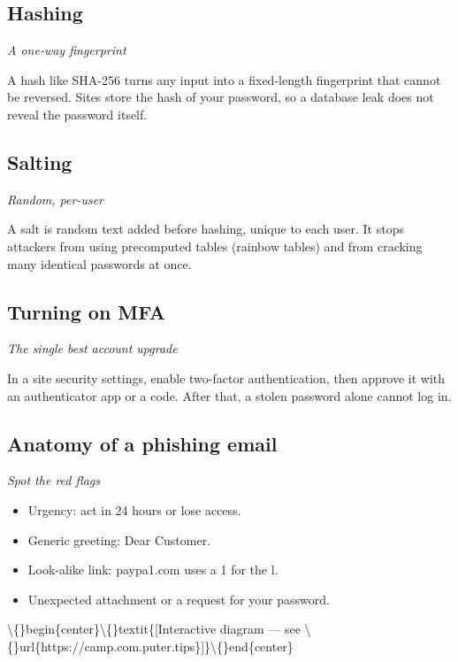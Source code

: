 \documentclass[12pt,openany]{book}
\begin{document}
\medskip

\subsection*{Hashing}
{\small\itshape\color{gray}A one-way fingerprint}


A hash like SHA-256 turns any input into a fixed-length fingerprint that cannot be reversed. Sites store the hash of your password, so a database leak does not reveal the password itself.

\medskip

\subsection*{Salting}
{\small\itshape\color{gray}Random, per-user}


A salt is random text added before hashing, unique to each user. It stops attackers from using precomputed tables (rainbow tables) and from cracking many identical passwords at once.

\medskip

\subsection*{Turning on MFA}
{\small\itshape\color{gray}The single best account upgrade}


In a site security settings, enable two-factor authentication, then approve it with an authenticator app or a code. After that, a stolen password alone cannot log in.

\medskip

\subsection*{Anatomy of a phishing email}
{\small\itshape\color{gray}Spot the red flags}


\begin{itemize}
  \item Urgency: act in 24 hours or lose access.
  \item Generic greeting: Dear Customer.
  \item Look-alike link: paypa1.com uses a 1 for the l.
  \item Unexpected attachment or a request for your password.
\end{itemize}


\textbackslash\{\}begin\{center\}\textbackslash\{\}textit\{[Interactive diagram --- see \textbackslash\{\}url\{https://camp.com.puter.tips\}]\}\textbackslash\{\}end\{center\}
\end{document}
